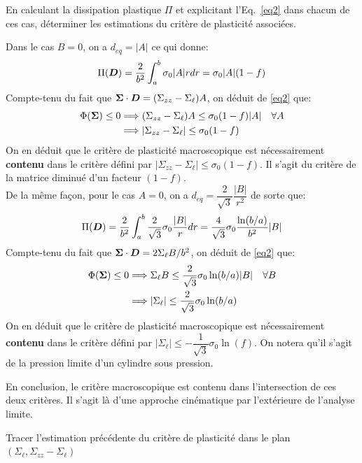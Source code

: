 \documentclass[french,english,12pt]{exam}
\begin{document}
\begin{questions}
\question En calculant la dissipation plastique $\Pi$ et explicitant l'Eq.~\ref{eq2} dans chacun de ces cas, déterminer les estimations du critère de plasticité associées.
\begin{solution}
Dans le cas $B=0$, on a $d_{eq}=|A|$ ce qui donne:
$$ \Pi(\boldsymbol{D}) = \frac{2}{b^2} \int_a^b \sigma_0 |A| rdr = \sigma_0 |A|(1-f)$$
Compte-tenu du fait que $\boldsymbol{\Sigma} \cdot \boldsymbol{D} = (\Sigma_{zz}-\Sigma_\ell)A$, on déduit de \eqref{eq2} que:
\begin{align*}
\Phi(\boldsymbol{\Sigma}) \leq 0 &\Longrightarrow (\Sigma_{zz}-\Sigma_\ell)A \leq \sigma_0 (1-f)|A| \quad \forall A\\
&\Longrightarrow |\Sigma_{zz}-\Sigma_\ell| \leq \sigma_0(1-f)
\end{align*}
On en déduit que le critère de plasticité macroscopique est nécessairement \textbf{contenu} dans le critère défini par $|\Sigma_{zz}-\Sigma_\ell| \leq \sigma_0(1-f)$. Il s'agit du critère de la matrice diminué d'un facteur $(1-f)$.\\

De la même façon, pour le cas $A=0$, on a $d_{eq} = \dfrac{2}{\sqrt{3}}\dfrac{|B|}{r^2}$ de sorte que:
$$ \Pi(\boldsymbol{D}) = \frac{2}{b^2} \int_a^b  \dfrac{2}{\sqrt{3}}\sigma_0 \dfrac{|B|}{r} dr = \dfrac{4}{\sqrt{3}}\sigma_0 \dfrac{\ln(b/a)}{b^2}|B|$$
Compte-tenu du fait que $\boldsymbol{\Sigma} \cdot \boldsymbol{D} = 2\Sigma_\ell B/b^2$, on déduit de \eqref{eq2} que:
\begin{align*}
\Phi(\boldsymbol{\Sigma}) \leq 0 &\Longrightarrow \Sigma_\ell B \leq \dfrac{2}{\sqrt{3}}\sigma_0 \ln(b/a)|B| \quad \forall B\\
&\Longrightarrow |\Sigma_\ell| \leq \dfrac{2}{\sqrt{3}}\sigma_0 \ln(b/a)
\end{align*}
On en déduit que le critère de plasticité macroscopique est nécessairement \textbf{contenu} dans le critère défini par $|\Sigma_\ell| \leq -\dfrac{1}{\sqrt{3}}\sigma_0 \ln(f)$. On notera qu'il s'agit de la pression limite d'un cylindre sous pression.

En conclusion, le critère macroscopique est contenu dans l'intersection de ces deux critères. Il s'agit là d'une approche cinématique par l'extérieure de l'analyse limite.
\end{solution}

\question Tracer l'estimation précédente du critère de plasticité dans le plan $( \Sigma_\ell, \Sigma_{zz} - \Sigma_\ell )$\\
\begin{solution}


\end{solution}
\end{questions}
\end{document}
